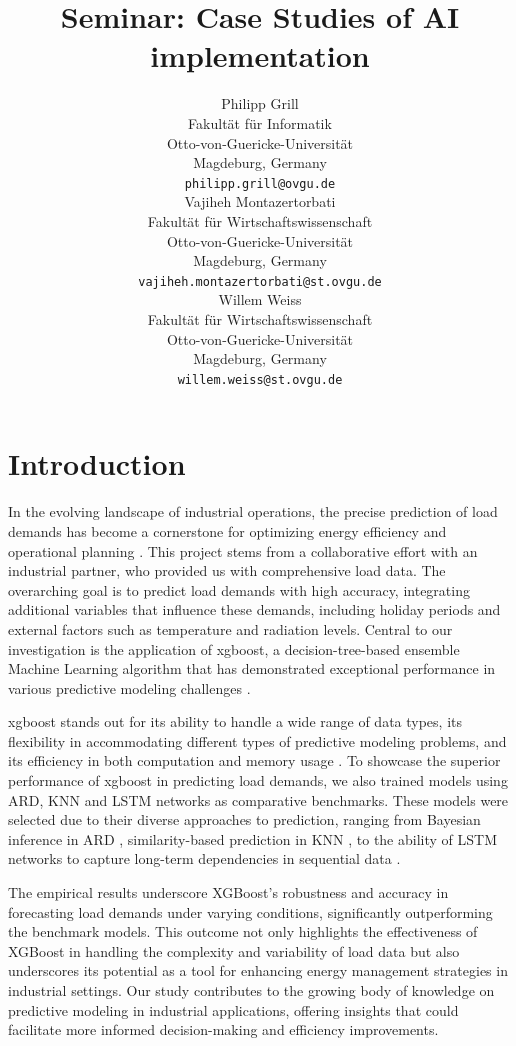 \documentclass{article} %
\title{Seminar:
Case Studies of AI implementation }
\author{
Philipp Grill \\
Fakultät für Informatik\\
Otto-von-Guericke-Universität\\
Magdeburg, Germany \\
\texttt{philipp.grill@ovgu.de} \\
\And
Vajiheh Montazertorbati \\
Fakultät für Wirtschaftswissenschaft\\
Otto-von-Guericke-Universität\\
Magdeburg, Germany \\
\texttt{vajiheh.montazertorbati@st.ovgu.de} \\
\And
Willem Weiss \\
Fakultät für Wirtschaftswissenschaft\\
Otto-von-Guericke-Universität\\
Magdeburg, Germany \\
\texttt{willem.weiss@st.ovgu.de} \\
}
\begin{document}
\maketitle

\section{Introduction}
In the evolving landscape of industrial operations, the precise prediction of load demands has become a cornerstone for optimizing energy efficiency and operational planning \cite{semmelmann2022load}. This project stems from a collaborative effort with an industrial partner, who provided us with comprehensive load data. The overarching goal is to predict load demands with high accuracy, integrating additional variables that influence these demands, including holiday periods and external factors such as temperature and radiation levels. Central to our investigation is the application of \gls*{xgboost}, a decision-tree-based ensemble Machine Learning algorithm that has demonstrated exceptional performance in various predictive modeling challenges \cite{chen2015xgboost}. 

\gls*{xgboost} stands out for its ability to handle a wide range of data types, its flexibility in accommodating different types of predictive modeling problems, and its efficiency in both computation and memory usage \cite{budholiya2022optimized}. To showcase the superior performance of \Gls*{xgboost} in predicting load demands, we also trained models using \gls*{ARD}, \gls*{KNN} and \gls*{LSTM} networks as comparative benchmarks. These models were selected due to their diverse approaches to prediction, ranging from Bayesian inference in \gls*{ARD} \cite{qi2004predictive}, similarity-based prediction in \gls*{KNN} \cite{cover1967nearest}, to the ability of \gls*{LSTM} networks to capture long-term dependencies in sequential data \cite{hochreiter1997long}. 

The empirical results underscore XGBoost's robustness and accuracy in forecasting load demands under varying conditions, significantly outperforming the benchmark models. This outcome not only highlights the effectiveness of XGBoost in handling the complexity and variability of load data but also underscores its potential as a tool for enhancing energy management strategies in industrial settings. Our study contributes to the growing body of knowledge on predictive modeling in industrial applications, offering insights that could facilitate more informed decision-making and efficiency improvements. 
\end{document}

